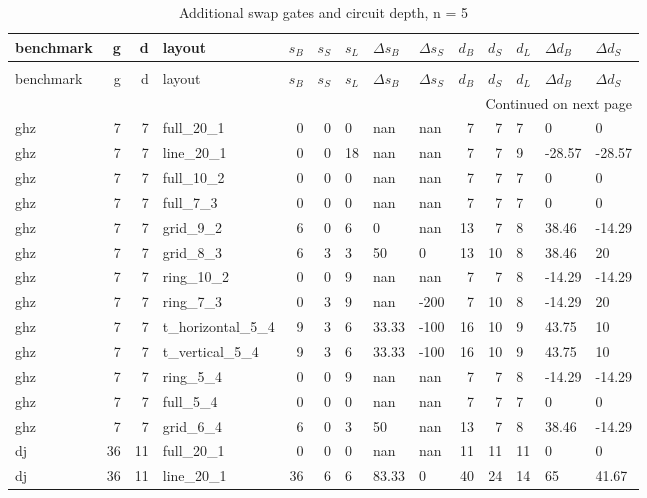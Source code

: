\begin{longtable}{lrrlrrlllrrlll}
\caption{Additional swap gates and circuit depth, n = 5} \label{benchmark-table-5} \\
\toprule
benchmark & g & d & layout & $s_B$ & $s_S$ & $s_L$ & $\Delta s_B$ & $\Delta s_S$ & $d_B$ & $d_S$ & $d_L$ & $\Delta d_B$ & $\Delta d_S$ \\
\midrule
\endfirsthead
\caption[]{Additional swap gates and circuit depth, n = 5} \\
\toprule
benchmark & g & d & layout & $s_B$ & $s_S$ & $s_L$ & $\Delta s_B$ & $\Delta s_S$ & $d_B$ & $d_S$ & $d_L$ & $\Delta d_B$ & $\Delta d_S$ \\
\midrule
\endhead
\midrule
\multicolumn{14}{r}{Continued on next page} \\
\midrule
\endfoot
\bottomrule
\endlastfoot
ghz & 7 & 7 & full\_20\_1 & 0 & 0 & 0 & nan & nan & 7 & 7 & 7 & 0 & 0 \\
ghz & 7 & 7 & line\_20\_1 & 0 & 0 & 18 & nan & nan & 7 & 7 & 9 & -28.57 & -28.57 \\
ghz & 7 & 7 & full\_10\_2 & 0 & 0 & 0 & nan & nan & 7 & 7 & 7 & 0 & 0 \\
ghz & 7 & 7 & full\_7\_3 & 0 & 0 & 0 & nan & nan & 7 & 7 & 7 & 0 & 0 \\
ghz & 7 & 7 & grid\_9\_2 & 6 & 0 & 6 & 0 & nan & 13 & 7 & 8 & 38.46 & -14.29 \\
ghz & 7 & 7 & grid\_8\_3 & 6 & 3 & 3 & 50 & 0 & 13 & 10 & 8 & 38.46 & 20 \\
ghz & 7 & 7 & ring\_10\_2 & 0 & 0 & 9 & nan & nan & 7 & 7 & 8 & -14.29 & -14.29 \\
ghz & 7 & 7 & ring\_7\_3 & 0 & 3 & 9 & nan & -200 & 7 & 10 & 8 & -14.29 & 20 \\
ghz & 7 & 7 & t\_horizontal\_5\_4 & 9 & 3 & 6 & 33.33 & -100 & 16 & 10 & 9 & 43.75 & 10 \\
ghz & 7 & 7 & t\_vertical\_5\_4 & 9 & 3 & 6 & 33.33 & -100 & 16 & 10 & 9 & 43.75 & 10 \\
ghz & 7 & 7 & ring\_5\_4 & 0 & 0 & 9 & nan & nan & 7 & 7 & 8 & -14.29 & -14.29 \\
ghz & 7 & 7 & full\_5\_4 & 0 & 0 & 0 & nan & nan & 7 & 7 & 7 & 0 & 0 \\
ghz & 7 & 7 & grid\_6\_4 & 6 & 0 & 3 & 50 & nan & 13 & 7 & 8 & 38.46 & -14.29 \\
dj & 36 & 11 & full\_20\_1 & 0 & 0 & 0 & nan & nan & 11 & 11 & 11 & 0 & 0 \\
dj & 36 & 11 & line\_20\_1 & 36 & 6 & 6 & 83.33 & 0 & 40 & 24 & 14 & 65 & 41.67 \\

\end{longtable}
